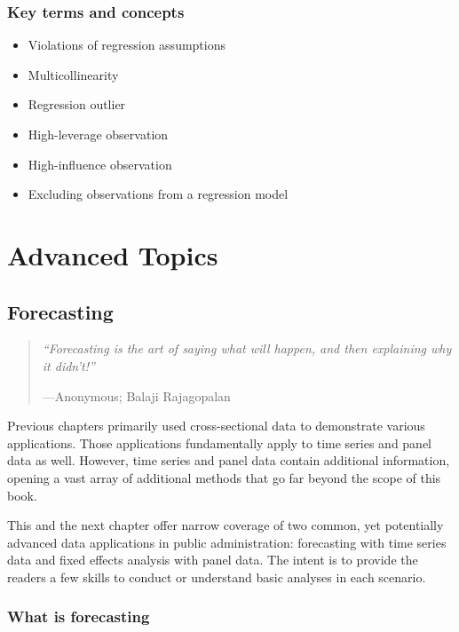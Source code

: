 \documentclass[
]{book}
\providecommand{\tightlist}{%
  \setlength{\itemsep}{0pt}\setlength{\parskip}{0pt}}
\begin{document}
\hypertarget{kt13}{%
\section{Key terms and concepts}\label{kt13}}

\begin{itemize}
\tightlist
\item
  Violations of regression assumptions
\item
  Multicollinearity
\item
  Regression outlier
\item
  High-leverage observation
\item
  High-influence observation
\item
  Excluding observations from a regression model
\end{itemize}

\hypertarget{part-advanced-topics}{%
\part{Advanced Topics}\label{part-advanced-topics}}

\hypertarget{forecasting}{%
\chapter{Forecasting}\label{forecasting}}

\begin{quote}
\emph{``Forecasting is the art of saying what will happen, and then explaining why it didn't!''}

---Anonymous; Balaji Rajagopalan
\end{quote}

Previous chapters primarily used cross-sectional data to demonstrate various applications. Those applications fundamentally apply to time series and panel data as well. However, time series and panel data contain additional information, opening a vast array of additional methods that go far beyond the scope of this book.

This and the next chapter offer narrow coverage of two common, yet potentially advanced data applications in public administration: forecasting with time series data and fixed effects analysis with panel data. The intent is to provide the readers a few skills to conduct or understand basic analyses in each scenario.

\hypertarget{what-is-forecasting}{%
\section{What is forecasting}\label{what-is-forecasting}}
\end{document}
